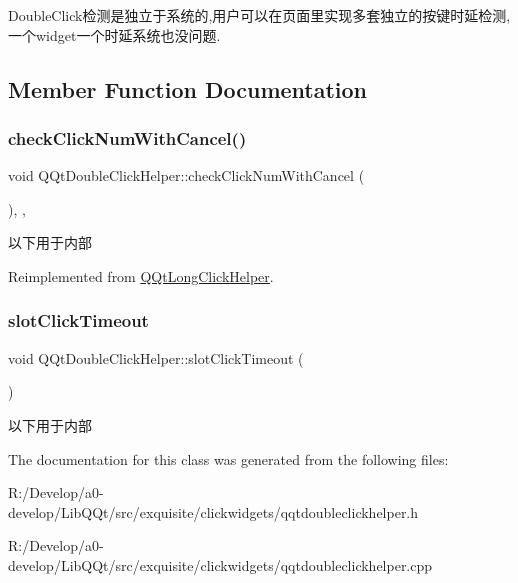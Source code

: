 Double\+Click检测是独立于系统的,用户可以在页面里实现多套独立的按键时延检测,一个widget一个时延系统也没问题. 

\subsection{Member Function Documentation}
\mbox{\label{class_q_qt_double_click_helper_a42ab28dcfaf01d7e8bf8bb01bd5ca311}} 
\subsubsection{\texorpdfstring{check\+Click\+Num\+With\+Cancel()}{checkClickNumWithCancel()}}
{\footnotesize\ttfamily void Q\+Qt\+Double\+Click\+Helper\+::check\+Click\+Num\+With\+Cancel (\begin{DoxyParamCaption}{ }\end{DoxyParamCaption})\hspace{0.3cm}{\ttfamily [override]}, {\ttfamily [protected]}, {\ttfamily [virtual]}}

以下用于内部 

Reimplemented from \mbox{\hyperlink{class_q_qt_long_click_helper_a9cc68a8b81d6ffe142509cdb31db78b1}{Q\+Qt\+Long\+Click\+Helper}}.

\mbox{\label{class_q_qt_double_click_helper_ab6526188b90a5466131f40aaad633cd0}} 
\subsubsection{\texorpdfstring{slot\+Click\+Timeout}{slotClickTimeout}}
{\footnotesize\ttfamily void Q\+Qt\+Double\+Click\+Helper\+::slot\+Click\+Timeout (\begin{DoxyParamCaption}{ }\end{DoxyParamCaption})\hspace{0.3cm}{\ttfamily [slot]}}

以下用于内部 

The documentation for this class was generated from the following files\+:\begin{DoxyCompactItemize}
\item 
R\+:/\+Develop/a0-\/develop/\+Lib\+Q\+Qt/src/exquisite/clickwidgets/qqtdoubleclickhelper.\+h\item 
R\+:/\+Develop/a0-\/develop/\+Lib\+Q\+Qt/src/exquisite/clickwidgets/qqtdoubleclickhelper.\+cpp\end{DoxyCompactItemize}
